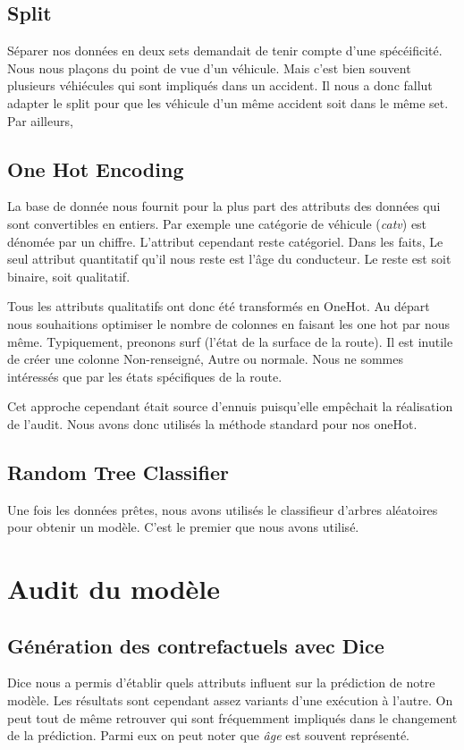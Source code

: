 \documentclass[]{article}
\begin{document}
    \subsection{Split}
    Séparer nos données en deux sets demandait de tenir compte d'une spécéificité. Nous nous plaçons du point de vue d'un véhicule. 
    Mais c'est bien souvent plusieurs véhiécules qui sont impliqués dans un accident. Il nous a donc fallut adapter le split pour que 
    les véhicule d'un même accident soit dans le même set. Par ailleurs, 

    \subsection{One Hot Encoding}
    La base de donnée nous fournit pour la plus part des attributs des données qui sont convertibles en entiers. 
    Par exemple une catégorie de véhicule (\textit{catv}) est dénomée par un chiffre. L'attribut cependant reste catégoriel. Dans les faits, 
    Le seul attribut quantitatif qu'il nous reste est l'âge du conducteur. 
    Le reste est soit binaire, soit qualitatif. 
    
    Tous les attributs qualitatifs ont donc été transformés en OneHot. Au départ nous souhaitions optimiser le nombre de colonnes en 
    faisant les one hot par nous même. Typiquement, preonons surf (l'état de la surface de la route). Il est inutile de créer une colonne 
    Non-renseigné, Autre ou normale. Nous ne sommes intéressés que par les états spécifiques de la route. 

    Cet approche cependant était source d'ennuis puisqu'elle empêchait la réalisation de l'audit. Nous avons donc utilisés la méthode 
    standard pour nos oneHot. 

    \subsection{Random Tree Classifier}
    Une fois les données prêtes, nous avons utilisés le classifieur d'arbres aléatoires pour obtenir un modèle. C'est le premier que nous 
    avons utilisé. 
    


    \section{Audit du modèle}

    \subsection{Génération des contrefactuels avec Dice}
    Dice nous a permis d'établir quels attributs influent sur la prédiction de notre modèle. Les résultats sont 
    cependant assez variants d'une exécution à l'autre. On peut tout de même retrouver qui sont fréquemment impliqués 
    dans le changement de la prédiction.
    Parmi eux on peut noter que \textit{âge} est souvent représenté.
\end{document}
